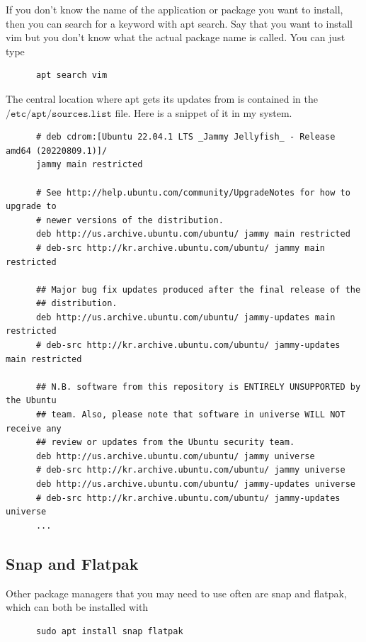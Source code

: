     If you don't know the name of the application or package you want to install, then you can search for a keyword with apt search. Say that you want to install vim but you don't know what the actual package name is called. You can just type 

    \begin{lstlisting}
      apt search vim
    \end{lstlisting}

    The central location where apt gets its updates from is contained in the $\texttt{/etc/apt/sources.list}$ file. Here is a snippet of it in my system. 
    \begin{lstlisting}
      # deb cdrom:[Ubuntu 22.04.1 LTS _Jammy Jellyfish_ - Release amd64 (20220809.1)]/ 
      jammy main restricted

      # See http://help.ubuntu.com/community/UpgradeNotes for how to upgrade to
      # newer versions of the distribution.
      deb http://us.archive.ubuntu.com/ubuntu/ jammy main restricted
      # deb-src http://kr.archive.ubuntu.com/ubuntu/ jammy main restricted

      ## Major bug fix updates produced after the final release of the
      ## distribution.
      deb http://us.archive.ubuntu.com/ubuntu/ jammy-updates main restricted
      # deb-src http://kr.archive.ubuntu.com/ubuntu/ jammy-updates main restricted

      ## N.B. software from this repository is ENTIRELY UNSUPPORTED by the Ubuntu
      ## team. Also, please note that software in universe WILL NOT receive any
      ## review or updates from the Ubuntu security team.
      deb http://us.archive.ubuntu.com/ubuntu/ jammy universe
      # deb-src http://kr.archive.ubuntu.com/ubuntu/ jammy universe
      deb http://us.archive.ubuntu.com/ubuntu/ jammy-updates universe
      # deb-src http://kr.archive.ubuntu.com/ubuntu/ jammy-updates universe
      ...
    \end{lstlisting}

  \subsection{Snap and Flatpak}

    Other package managers that you may need to use often are snap and flatpak, which can both be installed with 
    \begin{lstlisting}
      sudo apt install snap flatpak 
    \end{lstlisting}

